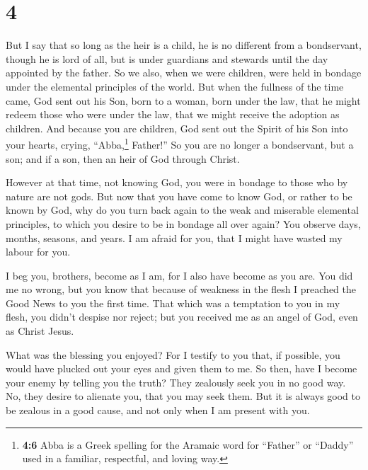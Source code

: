 \hypertarget{section-3}{%
\section{4}\label{section-3}}

 But I say that so long as the heir is a child, he is no
different from a bondservant, though he is lord of all, 
but is under guardians and stewards until the day appointed by the
father.  So we also, when we were children, were held in
bondage under the elemental principles of the world.  But
when the fullness of the time came, God sent out his Son, born to a
woman, born under the law,  that he might redeem those who
were under the law, that we might receive the adoption as children.
 And because you are children, God sent out the Spirit of
his Son into your hearts, crying, ``Abba,\footnote{\textbf{4:6} Abba is
  a Greek spelling for the Aramaic word for ``Father'' or ``Daddy'' used
  in a familiar, respectful, and loving way.} Father!'' 
So you are no longer a bondservant, but a son; and if a son, then an
heir of God through Christ.

 However at that time, not knowing God, you were in
bondage to those who by nature are not gods.  But now that
you have come to know God, or rather to be known by God, why do you turn
back again to the weak and miserable elemental principles, to which you
desire to be in bondage all over again?  You observe
days, months, seasons, and years.  I am afraid for you,
that I might have wasted my labour for you.

 I beg you, brothers, become as I am, for I also have
become as you are. You did me no wrong,  but you know
that because of weakness in the flesh I preached the Good News to you
the first time.  That which was a temptation to you in my
flesh, you didn't despise nor reject; but you received me as an angel of
God, even as Christ Jesus.

 What was the blessing you enjoyed? For I testify to you
that, if possible, you would have plucked out your eyes and given them
to me.  So then, have I become your enemy by telling you
the truth?  They zealously seek you in no good way. No,
they desire to alienate you, that you may seek them.  But
it is always good to be zealous in a good cause, and not only when I am
present with you.


